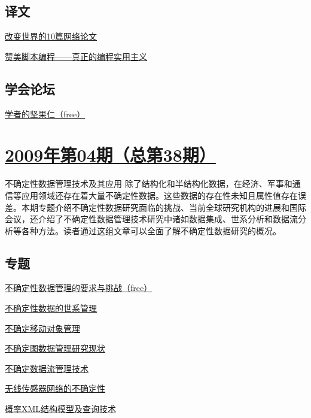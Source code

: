 \documentclass[a4paper]{article}
\begin{document}
\subsection{译文}
\href{http://history.ccf.org.cn/resources/1190201776262/2010/04/15/039068.pdf}{改变世界的10篇网络论文}

\href{http://history.ccf.org.cn/resources/1190201776262/2010/04/15/039072.pdf}{赞美脚本编程——真正的编程实用主义}

\subsection{学会论坛}
\href{http://history.ccf.org.cn/resources/1190201776262/2010/04/15/039092.pdf}{学者的坚果仁（free）}


\section{\href{http://history.ccf.org.cn/sites/ccf/jsjtbbd.jsp?contentId=2542567629031}{\textbf{2009年第04期（总第38期）}}}
不确定性数据管理技术及其应用 除了结构化和半结构化数据，在经济、军事和通信等应用领域还存在着大量不确定性数据。这些数据的存在性未知且属性值存在误差。本期专题介绍不确定性数据研究面临的挑战、当前全球研究机构的进展和国际会议，还介绍了不确定性数据管理技术研究中诸如数据集成、世系分析和数据流分析等各种方法。读者通过这组文章可以全面了解不确定性数据研究的概况。
\subsection{专题}
\href{http://history.ccf.org.cn/resources/1190201776262/2010/04/15/038006.pdf}{不确定性数据管理的要求与挑战（free）}

\href{http://history.ccf.org.cn/resources/1190201776262/2010/04/15/038014.pdf}{不确定性数据的世系管理}

\href{http://history.ccf.org.cn/resources/1190201776262/2010/04/15/038021.pdf}{不确定移动对象管理}

\href{http://history.ccf.org.cn/resources/1190201776262/2010/04/15/038031.pdf}{不确定图数据管理研究现状}

\href{http://history.ccf.org.cn/resources/1190201776262/2010/04/15/038037.pdf}{不确定数据流管理技术}

\href{http://history.ccf.org.cn/resources/1190201776262/2010/04/15/038045.pdf}{无线传感器网络的不确定性}

\href{http://history.ccf.org.cn/resources/1190201776262/2010/04/15/038052.pdf}{概率XML结构模型及查询技术}
\end{document}
